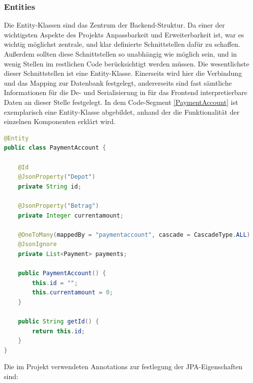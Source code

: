 \FloatBarrier
\subsubsection{Entities}\label{sec:entities}

Die Entity-Klassen sind das Zentrum der Backend-Struktur. Da einer der wichtigsten Aspekte des Projekts Anpassbarkeit und Erweiterbarkeit ist, war es wichtig möglichst zentrale, und klar definierte Schnittstellen dafür zu schaffen. Außerdem sollten diese Schnittstellen so unabhängig wie möglich sein, und in wenig Stellen im restlichen Code berücksichtigt werden müssen. Die wesentlichste dieser Schnittstellen ist eine Entity-Klasse. Einerseits wird hier die Verbindung und das Mapping zur Datenbank festgelegt, andererseits sind fast sämtliche Informationen für die De- und Serialisierung in für das Frontend interpretierbare Daten an dieser Stelle festgelegt. In dem Code-Segment \ref{PaymentAccount} ist exemplarisch eine Entity-Klasse abgebildet, anhand der die Funktionalität der einzelnen Komponenten erklärt wird.

\scriptsize
\begin{lstlisting}[caption=PaymentAccount.java, label=PaymentAccount, language=Java]
@Entity
public class PaymentAccount {

	@Id
	@JsonProperty("Depot")
	private String id;
	
	@JsonProperty("Betrag")
	private Integer currentamount;
	
	@OneToMany(mappedBy = "paymentaccount", cascade = CascadeType.ALL)
	@JsonIgnore
	private List<Payment> payments;
	
	public PaymentAccount() {
		this.id = "";
		this.currentamount = 0;
	}
	
	public String getId() { 
		return this.id; 
	}
}
\end{lstlisting}
\normalsize


Die im Projekt verwendeten Annotations zur festlegung der JPA-Eigenschaften sind:


